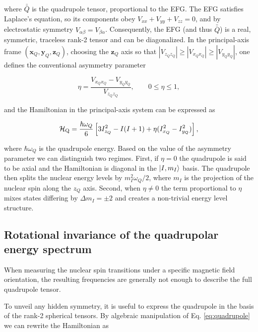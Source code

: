 \noindent where $\bar{\bar{Q}}$ is the quadrupole tensor, proportional to the EFG. The EFG satisfies Laplace's equation, so its components obey $V_{xx}+V_{yy}+V_{zz}=0$, and by electrostatic symmetry $V_{\alpha\beta}=V_{\beta\alpha}$. Consequently, the EFG (and thus $\bar{\bar{Q}}$) is a real, symmetric, traceless rank-2 tensor and can be diagonalized. In the principal-axis frame $(\mathbf{x}_Q,\mathbf{y}_Q,\mathbf{z}_Q)$, choosing the $\mathbf{z}_Q$ axis so that $|V_{z_Qz_Q}|\ge|V_{x_Qx_Q}|\ge|V_{y_Qy_Q}|$, one defines the conventional asymmetry parameter

\begin{equation}
    \eta = \frac{V_{x_Qx_Q}-V_{y_Qy_Q}}{V_{z_Qz_Q}}, \qquad 0\leq\eta\leq1,
\end{equation}

\noindent and the Hamiltonian in the principal-axis system can be expressed as

\begin{equation}
\mathcal{H}_{\text{Q}} = \frac{\hbar \omega_Q}{6}\left[ 3 I_{z_Q}^2 - I(I+1) + \eta(I_{x_Q}^2 - I_{y_Q}^2)\right],
\end{equation}

where $\hbar \omega_Q$ is the quadrupole energy. Based on the value of the asymmetry parameter we can distinguish two regimes. First, if $\eta=0$ the quadrupole is said to be axial and the Hamiltonian is diagonal in the $\ket{I,m_I}$ basis. The quadrupole then splits the nuclear energy levels by $m_I^2 \omega_Q/2 $, where $m_I$ is the projection of the nuclear spin along the $z_Q$ axis. Second, when $\eta\neq0$ the term proportional to $\eta$ mixes states differing by $\Delta m_I=\pm2$ and creates a non-trivial energy level structure. 


\subsection{Rotational invariance of the quadrupolar energy spectrum}

When measuring the nuclear spin transitions under a specific magnetic field orientation, the resulting frequencies are generally not enough to describe the full quadrupole tensor. 

To unveil any hidden symmetry, it is useful to express the quadrupole in the basis of the rank-2 spherical tensors. By algebraic manipulation of Eq. \ref{eq:quadrupole} we can rewrite the Hamiltonian as

